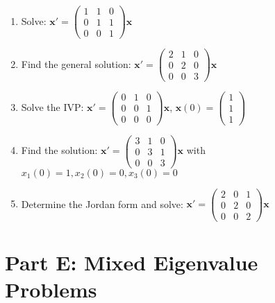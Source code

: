 \documentclass[12pt]{article}
\begin{document}
\begin{enumerate}[start=16]
\item Solve: $\mathbf{x}' = \begin{pmatrix} 1 & 1 & 0 \\ 0 & 1 & 1 \\ 0 & 0 & 1 \end{pmatrix}\mathbf{x}$

\item Find the general solution: $\mathbf{x}' = \begin{pmatrix} 2 & 1 & 0 \\ 0 & 2 & 0 \\ 0 & 0 & 3 \end{pmatrix}\mathbf{x}$

\item Solve the IVP: $\mathbf{x}' = \begin{pmatrix} 0 & 1 & 0 \\ 0 & 0 & 1 \\ 0 & 0 & 0 \end{pmatrix}\mathbf{x}$, $\mathbf{x}(0) = \begin{pmatrix} 1 \\ 1 \\ 1 \end{pmatrix}$

\item Find the solution: $\mathbf{x}' = \begin{pmatrix} 3 & 1 & 0 \\ 0 & 3 & 1 \\ 0 & 0 & 3 \end{pmatrix}\mathbf{x}$ with $x_{1}(0) = 1, x_{2}(0) = 0, x_{3}(0) = 0$

\item Determine the Jordan form and solve: $\mathbf{x}' = \begin{pmatrix} 2 & 0 & 1 \\ 0 & 2 & 0 \\ 0 & 0 & 2 \end{pmatrix}\mathbf{x}$
\end{enumerate}

\section*{Part E: Mixed Eigenvalue Problems}
\end{document}
